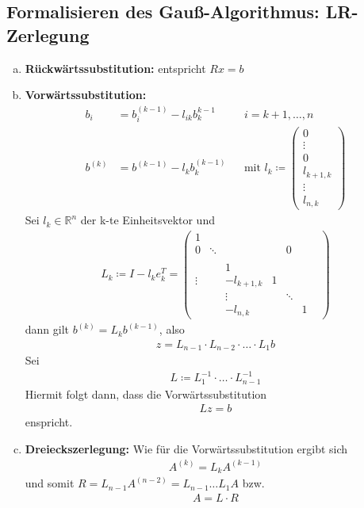 \documentclass[ngerman,fontsize=11pt, paper=a4, parskip=half, titlepage=true, toc=bib]{scrbook}
\theoremstyle{definition}
\theoremstyle{plain}
\newcommand{\R}{\mathds{R}}
\newcommand{\subsectione}[1]{\addtocounter{Def}{1}\subsection{#1}}
\begin{document}
\subsectione{Formalisieren des Gauß-Algorithmus: LR-Zerlegung}
 
\begin{enumerate}[a)]
\item \textbf{Rückwärtssubstitution:} entspricht $Rx=b$
\item \textbf{Vorwärtssubstitution:} 
  \begin{align*}
    b_i&=b_i^{(k-1)}-l_{ik}b_k^{k-1} && i=k+1, \dotsc , n\\
    b^{(k)} &= b^{(k-1)}-l_kb_k^{(k-1)} 
                                     && \text{mit }l_k\coloneqq 
                                        \begin{pmatrix}0\\\vdots\\ 0\\ l_{k+1,k}\\\vdots \\l_{n,k}\end{pmatrix}
  \end{align*}
  Sei $l_k\in\R^n$ der k-te Einheitsvektor und 
  \begin{gather}
    L_k \coloneqq I- l_ke_k^T = \begin{pmatrix}
      1&&&&&&\\
      0&\ddots&&&0\\
      \\
      &&1\\
      \vdots&&-l_{k+1,k}&1\\
      &&\vdots&&\ddots \\
      &&-l_{n,k}&&&1
    \end{pmatrix}
    \label{II.1.9}
  \end{gather}
  dann gilt $b^{(k)} =L_kb^{(k-1)}$, also
  \begin{gather*}
    z = L_{n-1}\cdot L_{n-2} \cdot \dots \cdot L_1b
  \end{gather*}
  Sei
  \begin{gather}
    L\coloneqq L_1^{-1} \cdot \dots \cdot L_{n-1}^{-1}
    \label{II.1.10}
  \end{gather}
  Hiermit folgt dann, dass die Vorwärtssubstitution
  \begin{gather}
    Lz=b\label{II.1.11}
  \end{gather}
  enspricht.
\item \textbf{Dreieckszerlegung:} Wie für die Vorwärtssubstitution ergibt sich
  \begin{gather*}
    A^{(k)}=L_kA^{(k-1)}
  \end{gather*}
  und somit $R=L_{n-1}A^{(n-2)}= L_{n-1}\dots L_1A $ bzw.
  \begin{gather} 
    A=L\cdot R
    \label{II.1.12}
  \end{gather}
\end{enumerate}
\end{document}
